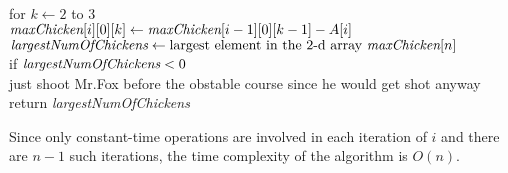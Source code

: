 \documentclass[11pt]{article}
\begin{document}
\begin{solution}
\begin{algo}
\\	for $k\gets 2$ to $3$\+
\\	$\emph{maxChicken}[i][0][k]\gets \emph{maxChicken}[i-1][0][k-1] - A[i]$\-\-
\\	$\emph{largestNumOfChickens}\gets \text{largest element in the $2$-d array \emph{maxChicken$[n]$}}$
\\	if $\emph{largestNumOfChickens} < 0$\+
\\	just shoot Mr.Fox before the obstable course since he would get shot anyway\-
\\	return \emph{largestNumOfChickens}
\end{algo}
Since only constant-time operations are involved in each iteration of $i$ and there are $n-1$ such iterations, the time complexity of the algorithm is $O(n)$.
\end{solution}
\end{document}
